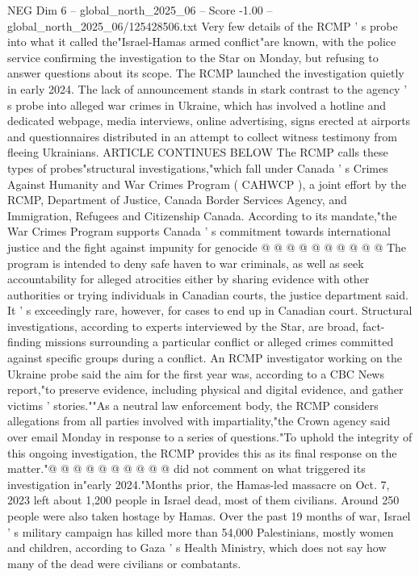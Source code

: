 \begin{textsample}{NEG Dim 6 – global\_north\_2025\_06 – Score -1.00 – global\_north\_2025\_06/125428506.txt}  \label{ex:f6_neg_435}
Very few details of the RCMP ' s probe into what it called the"Israel-Hamas armed conflict"are known, with the police service confirming the investigation to the Star on Monday, but refusing to answer questions about its scope.
The RCMP launched the investigation quietly in early 2024.
The lack of announcement stands in stark contrast to the agency ' s probe into alleged war crimes in Ukraine, which has involved a hotline and dedicated webpage, media interviews, online advertising, signs erected at airports and questionnaires distributed in an attempt to collect witness testimony from fleeing Ukrainians.
ARTICLE CONTINUES BELOW The RCMP calls these types of probes"structural investigations,"which fall under Canada ' s Crimes Against Humanity and War Crimes Program ( CAHWCP ), a joint effort by the RCMP, Department of Justice, Canada Border Services Agency, and Immigration, Refugees and Citizenship Canada.
According to its mandate,"the War Crimes Program supports Canada ' s commitment towards international justice and the fight against impunity for genocide @ @ @ @ @ @ @ @ @ @ The program is intended to deny safe haven to war criminals, as well as seek accountability for alleged atrocities either by sharing evidence with other authorities or trying individuals in Canadian courts, the justice department said.
It ' s exceedingly rare, however, for cases to end up in Canadian court.
Structural investigations, according to experts interviewed by the Star, are broad, fact-finding missions surrounding a particular conflict or alleged crimes committed against specific groups during a conflict.
An RCMP investigator working on the Ukraine probe said the aim for the first year was, according to a CBC News report,"to preserve evidence, including physical and digital evidence, and gather victims ' stories.""As a neutral law enforcement body, the RCMP considers allegations from all parties involved with impartiality,"the Crown agency said over email Monday in response to a series of questions."To uphold the integrity of this ongoing investigation, the RCMP provides this as its final response on the matter."@ @ @ @ @ @ @ @ @ @ did not comment on what triggered its investigation in"early 2024."Months prior, the Hamas-led massacre on Oct. 7, 2023 left about 1,200 people in Israel dead, most of them civilians.
Around 250 people were also taken hostage by Hamas.
Over the past 19 months of war, Israel ' s military campaign has killed more than 54,000 Palestinians, mostly women and children, according to Gaza ' s Health Ministry, which does not say how many of the dead were civilians or combatants.

\end{textsample}
